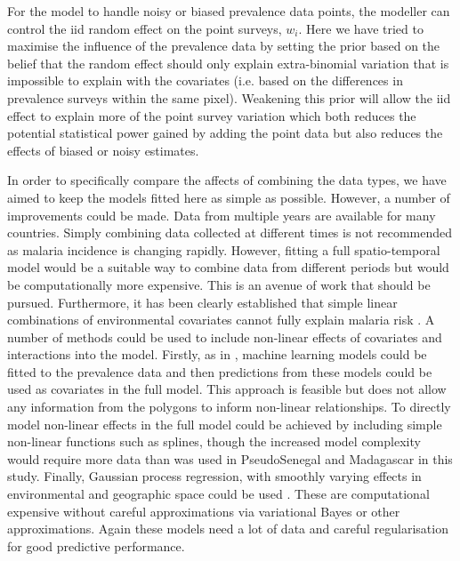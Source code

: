 \documentclass[10pt,letterpaper]{article}
\begin{document}
For the model to handle noisy or biased prevalence data points, the modeller can control the iid random effect on the point surveys, $w_i$. 
Here we have tried to maximise the influence of the prevalence data by setting the prior based on the belief that the random effect should only explain extra-binomial variation that is impossible to explain with the covariates (i.e. based on the differences in prevalence surveys within the same pixel).
Weakening this prior will allow the iid effect to explain more of the point survey variation which both reduces the potential statistical power gained by adding the point data but also reduces the effects of biased or noisy estimates.

In order to specifically compare the affects of combining the data types, we have aimed to keep the models fitted here as simple as possible.
However, a number of improvements could be made.
Data from multiple years are available for many countries.
Simply combining data collected at different times is not recommended as malaria incidence is changing rapidly.
However, fitting a full spatio-temporal model would be a suitable way to combine data from different periods but would be computationally more expensive.
This is an avenue of work that should be pursued.
Furthermore, it has been clearly established that simple linear combinations of environmental covariates cannot fully explain malaria risk \cite{bhatt2017improved}.
A number of methods could be used to include non-linear effects of covariates and interactions into the model.
Firstly, as in \cite{bhatt2017improved}, machine learning models could be fitted to the prevalence data and then predictions from these models could be used as covariates in the full model.
This approach is feasible but does not allow any information from the polygons to inform non-linear relationships.
To directly model non-linear effects in the full model could be achieved by including simple non-linear functions such as splines, though the increased model complexity would require more data than was used in PseudoSenegal and Madagascar in this study.
Finally, Gaussian process regression, with smoothly varying effects in environmental and geographic space could be used \cite{law2018variational}.
These are computational expensive without careful approximations via variational Bayes or other approximations.
Again these models need a lot of data and careful regularisation for good predictive performance.




\end{document}
